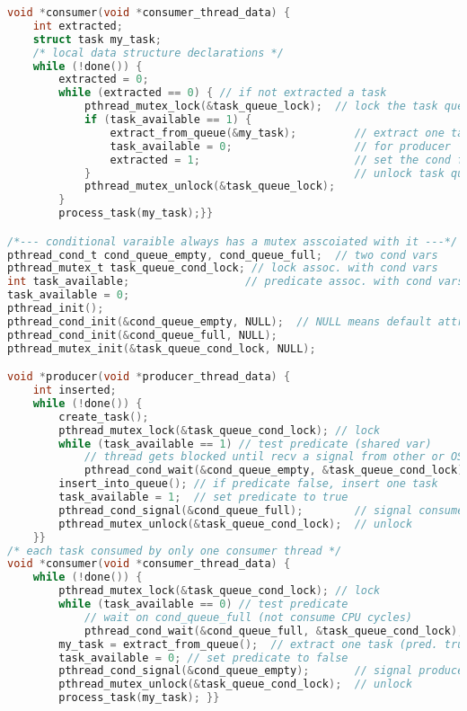 \begin{lstlisting}[language=C]
void *consumer(void *consumer_thread_data) {
    int extracted;
    struct task my_task;
    /* local data structure declarations */
    while (!done()) {
        extracted = 0;
        while (extracted == 0) { // if not extracted a task
            pthread_mutex_lock(&task_queue_lock);  // lock the task queue
            if (task_available == 1) {
                extract_from_queue(&my_task);         // extract one task
                task_available = 0;                   // for producer
                extracted = 1;                        // set the cond flag
            }                                         // unlock task queue
            pthread_mutex_unlock(&task_queue_lock);
        }
        process_task(my_task);}}

/*--- conditional varaible always has a mutex asscoiated with it ---*/
pthread_cond_t cond_queue_empty, cond_queue_full;  // two cond vars
pthread_mutex_t task_queue_cond_lock; // lock assoc. with cond vars
int task_available;                  // predicate assoc. with cond vars
task_available = 0;
pthread_init();
pthread_cond_init(&cond_queue_empty, NULL);  // NULL means default attrs
pthread_cond_init(&cond_queue_full, NULL);
pthread_mutex_init(&task_queue_cond_lock, NULL);

void *producer(void *producer_thread_data) {
    int inserted;
    while (!done()) {
        create_task();
        pthread_mutex_lock(&task_queue_cond_lock); // lock
        while (task_available == 1) // test predicate (shared var)
            // thread gets blocked until recv a signal from other or OS
            pthread_cond_wait(&cond_queue_empty, &task_queue_cond_lock);
        insert_into_queue(); // if predicate false, insert one task
        task_available = 1;  // set predicate to true
        pthread_cond_signal(&cond_queue_full);        // signal consumer
        pthread_mutex_unlock(&task_queue_cond_lock);  // unlock
    }}
/* each task consumed by only one consumer thread */
void *consumer(void *consumer_thread_data) {
    while (!done()) {
        pthread_mutex_lock(&task_queue_cond_lock); // lock
        while (task_available == 0) // test predicate
            // wait on cond_queue_full (not consume CPU cycles)
            pthread_cond_wait(&cond_queue_full, &task_queue_cond_lock);
        my_task = extract_from_queue();  // extract one task (pred. true)
        task_available = 0; // set predicate to false
        pthread_cond_signal(&cond_queue_empty);       // signal producer
        pthread_mutex_unlock(&task_queue_cond_lock);  // unlock
        process_task(my_task); }}
\end{lstlisting}

